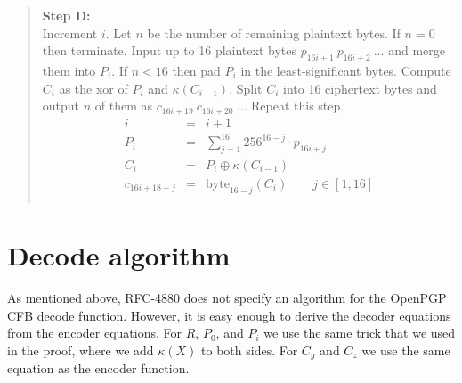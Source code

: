 \documentclass{article}
\newcommand{\xbyte}{\mathrm{byte}}
\begin{document}
\begin{quote}
\textbf{Step D:}\\
Increment $i$.
Let $n$ be the number of remaining plaintext bytes.
If $n=0$ then terminate.
Input up to 16 plaintext bytes $p_{16i+1}\ p_{16i+2}\ \ldots$ and merge them into $P_i$.
If $n<16$ then pad $P_i$ in the least-significant bytes.
Compute $C_i$ as the xor of $P_i$ and $\kappa(C_{i-1})$.
Split $C_i$ into 16 ciphertext bytes and output $n$ of them as $c_{16i+19}\ c_{16i+20}\ \ldots$
Repeat this step.
\begin{eqnarray*}
  i &=& i + 1 \\
  P_i &=& \sum_{j=1}^{16} 256^{16-j} \cdot p_{16i+j} \\
  C_i &=& P_i \oplus \kappa(C_{i-1}) \\
  c_{16i+18+j} &=& \xbyte_{16-j}(C_i) \qquad j \in [1,16] \\
\end{eqnarray*}
\end{quote}

\section*{Decode algorithm}

As mentioned above, RFC-4880 does not specify an algorithm for the OpenPGP CFB decode function.
However, it is easy enough to derive the decoder equations from the encoder equations.
For $R$, $P_0$, and $P_i$ we use the same trick that we used in the proof, 
where we add $\kappa(X)$ to both sides.
For $C_y$ and $C_z$ we use the same equation as the encoder function.
\end{document}
